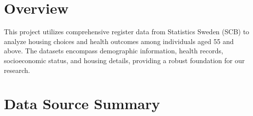 \documentclass[
]{book}
\begin{document}
\hypertarget{overview}{%
\section{Overview}\label{overview}}

This project utilizes comprehensive register data from Statistics Sweden (SCB) to analyze housing choices and health outcomes among individuals aged 55 and above. The datasets encompass demographic information, health records, socioeconomic status, and housing details, providing a robust foundation for our research.

\hypertarget{data-source-summary}{%
\section{Data Source Summary}\label{data-source-summary}}
\end{document}

